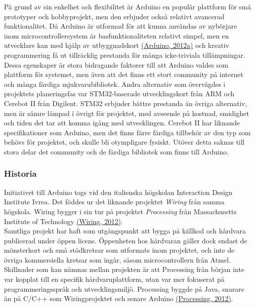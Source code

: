 \documentclass[a4paper,11pt]{article}
\begin{document}
På grund av sin enkelhet och flexibilitet är Arduino en populär plattform för små prototyper och hobbyprojekt, men den erbjuder också relativt avancerad funktionalitet. Då Arduino är utformad för att kunna användas av nybörjare inom microcontrollersystem är basfunktionaliteten relativt simpel, men en utvecklare kan med hjälp av utbyggnadskort \hyperref[arduino]{(Arduino, 2012a)} och kreativ programmering få ut tillräcklig prestanda för många icke-triviala tillämpningar. Dessa egenskaper är stora bidragande faktorer till att Arduino valdes som plattform för systemet, men även att det finns ett stort community på internet och många färdiga mjukvarubibliotek. Andra alternativ som övervägdes i projektets planeringsfas var STM32-baserade utvecklingskort från ARM och Cerebot II från Digilent. STM32 erbjuder bättre prestanda än övriga alternativ, men är sämre lämpad i övrigt för projektet, med avseende på kostnad, smidighet och tiden det tar att komma igång med utvecklingen. Cerebot II har liknande specifikationer som Arduino, men det finns färre färdiga tillbehör av den typ som behövs för projektet, och skulle bli otympligare fysiskt. Utöver detta saknas till stora delar det community och de färdiga bibliotek som finns till Arduino.\\

\subsubsection{Historia}
Initiativet till Arduino togs vid den italienska högskolan Interaction Design Institute Ivrea. Det föddes ur det liknande projektet {\it Wiring} från samma högskola. Wiring bygger i sin tur på projektet {\it Processing} från Massachusetts Institute of Technology \hyperref[wiring]{(Wiring, 2012)}. \\

Samtliga projekt har haft som utgångspunkt att bygga på källkod och hårdvara publicerad under öppen licens. Öppenheten hos hårdvaran gäller dock endast de mönsterkort och små stödkretsar som utformats inom projektet, och inte de övriga kommersiella kretsar som ingår, såsom microcontrollern från Atmel. Skillnader  som kan nämnas mellan projekten är att Processing från början inte var kopplat till en specifik hårdvaruplattform, utan var mer fokuserat på programmeringsspråk och utvecklingsmiljö. Processing byggde på Java, snarare än på C/C++ som Wiringprojektet och senare Arduino \hyperref[processing]{(Processing, 2012)}.
\end{document}

